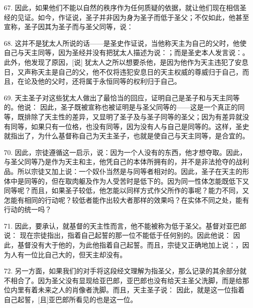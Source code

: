 67. 因此，如果他们不能以自然的秩序作为任何质疑的依据，就让他们现在相信圣经的见证。如今，作证说，圣子并非因为身为圣子而低于圣父；不仅如此，他甚至宣称，圣子因其为圣子而与圣父同等，说：\par

68. 这并不是犹太人所说的话——是圣史作证说，当他称天主为自己的父时，他使自己与天主同等，因为圣经并没有把犹太人描述为说：；而是圣史本人发言说：。此外，他发现了原因，[说] 犹太人之所以想要杀他，是因为他作为天主违犯了安息日，又声称天主是自己的父，他不仅将违犯安息日的天主权威的尊威归于自己，而且，在论及他的父时，还将属于永恒同等的权利归于自己。\par

69. 天主圣子对这些犹太人做出了最恰当的回应，证明自己是圣子和与天主同等的。他说： 因此，圣子既被宣称也被证明是与圣父同等的——这是一个真正的同等，既排除了天主性的差异，又显明了圣子及与圣子同等的圣父；因为有差异就没有同等，如果只有一位格，也没有同等，因为没有人与自己是同等的。这样，圣史就指出了，为什么基督称自己为天主圣子，也就是使自己与天主同等，是合宜的。\par

70. 因此，宗徒遵循这一启示，说：因为一个人没有的东西，他才想夺取。因此，与圣父同等乃是作为天主和主，他凭自己的本体所拥有的，并不是非法抢夺的战利品。所以宗徒又加上说：一个奴仆当然是与同等者相对的。因此，圣子在天主的形体中是同等的，但在取肉躯及作为人受苦时是低下的。因为同一性体怎能既低下又同等呢？而且，如果圣子较低，他怎能以同样方式作父所作的事呢？能力不同，又怎能有相同的行动呢？较低者能作出较大者那样的效果吗？在实体不同之处，能有行动的统一吗？\par

71. 因此，要承认，就基督的天主性而言，他不能被称为低于圣父。基督对亚巴郎说： 现在宗徒指出，指着自己起誓的那一位不能低于任何别的。因此他说： 因此，基督没有大于他的，为此他指着自己起誓。而且，宗徒又正确地加上说：，因为人有一位比自己大的，但天主却没有。\par

72. 另一方面，如果我们的对手将这段经文理解为指圣父，那么记录的其余部分就不相合了。因为圣父没有显现给亚巴郎，亚巴郎也没有给天主圣父洗脚，而是给那位内里有着未来之人的肖像者洗脚。而且，天主圣子说： 因此，就是这一位指着自己起誓，[且]亚巴郎所看见的也是这一位。\par

